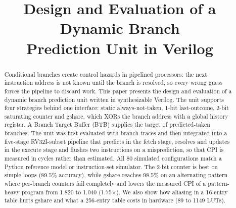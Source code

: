 \documentclass[conference]{IEEEtran}
\begin{document}
\title{Design and Evaluation of a Dynamic Branch\\Prediction Unit in Verilog}

\author{
\and
{}
\and
{}
\and
{}
\and
{}
}

\maketitle

\begin{abstract}
Conditional branches create control hazards in pipelined processors: the next instruction
address is not known until the branch is resolved, so every wrong guess forces the pipeline to
discard work. This paper presents the design and evaluation of a dynamic branch prediction unit
written in synthesizable Verilog. The unit supports four strategies behind one interface: static
always-not-taken, 1-bit last-outcome, 2-bit saturating counter and gshare, which XORs the branch
address with a global history register. A Branch Target Buffer (BTB) supplies the target of
predicted-taken branches. The unit was first evaluated with branch traces and then integrated
into a five-stage RV32I-subset pipeline that predicts in the fetch stage, resolves and updates in
the execute stage and flushes two instructions on a misprediction, so that CPI is measured in
cycles rather than estimated. All 80 simulated configurations match a Python reference model or
instruction-set simulator. The 2-bit counter is best on simple loops (89.5\% accuracy), while
gshare reaches 98.5\% on an alternating pattern where per-branch counters fail completely and
lowers the measured CPI of a pattern-heavy program from 1.820 to 1.040 (1.75$\times$). We also
show how aliasing in a 16-entry table hurts gshare and what a 256-entry table costs in hardware
(89 to 1149 LUTs).
\end{abstract}
\end{document}
